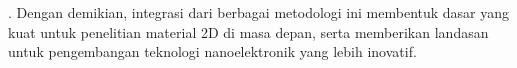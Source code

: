 \citep{Lele2022}. Dengan demikian, integrasi dari berbagai metodologi ini membentuk dasar yang kuat untuk penelitian material 2D di masa depan, serta memberikan landasan untuk pengembangan teknologi nanoelektronik yang lebih inovatif. %
